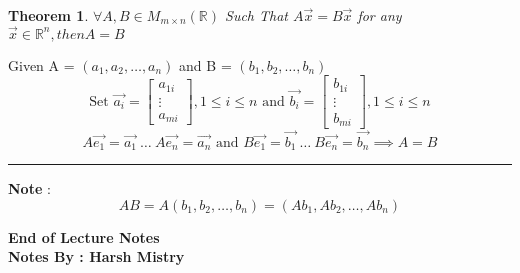\documentclass{article}
\newcounter{lecnum}
\newtheorem{theorem}{Theorem}[lecnum]
\newenvironment{proof}{{\bf Proof:}}{\hfill\rule{2mm}{2mm}}
\begin{document}
\begin{theorem}
\(\forall A , B \in M_{m\times n } (\mathbb{R}) \) Such That \(A\vec{x} = B \vec{x} \) for any \(\vec{x} \in \mathbb{R}^n , then A = B \) 
\end{theorem}

\begin{proof}
Given A = \( (a_1, a_2, \ldots, a_n) \) and B = \( (b_1, b_2, \ldots, b_n) \) \\
\[ \text{Set } \vec{a_i} = \begin{bmatrix} a_{1i} \\ \vdots \\ a_{mi} \end{bmatrix} , 1 \leq i \leq n \text{ and } \vec{b_i} = \begin{bmatrix} b_{1i} \\ \vdots \\ b_{mi} \end{bmatrix} , 1 \leq i \leq n \]
\[ A\vec{e_1} = \vec{a_1} \  \ldots \ A\vec{e_n} = \vec{a_n} \text{ and } B\vec{e_1} = \vec{b_1} \  \ldots \ B\vec{e_n} = \vec{b_n}  \implies A
 = B\]

\end{proof}

\textbf{Note} : 
\[ AB = A (b_1, b_2, \ldots, b_n) =  (Ab_1, Ab_2, \ldots, Ab_n)\]

\begin{center}
\textbf{End of Lecture Notes} \\
\textbf{Notes By : Harsh Mistry}
\end{center}
\end{document}
